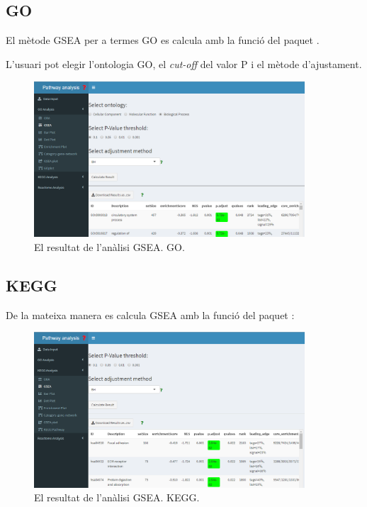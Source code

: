 \subsection{\gls{GO}}
El mètode \gls{GSEA} per a termes \gls{GO} es calcula amb la funció  del paquet . 

L'usuari pot elegir l'ontologia \gls{GO}, el \textit{cut-off} del valor P i el mètode d'ajustament.
\begin{figure}[H]
\centering
\includegraphics[width=0.9\textwidth]{figures/App_F11_Items_GO_GSEA.png} 
\caption{El resultat de l'anàlisi \gls{GSEA}. \gls{GO}.}
\end{figure}


\subsection{\gls{KEGG}}
De la mateixa manera es calcula \gls{GSEA} amb la funció  del paquet :

\begin{figure}[H]
\centering
\includegraphics[width=0.9\textwidth]{figures/App_F12_Items_KEGG_GSEA.png} 
\caption{El resultat de l'anàlisi \gls{GSEA}. \gls{KEGG}.}
\end{figure}

